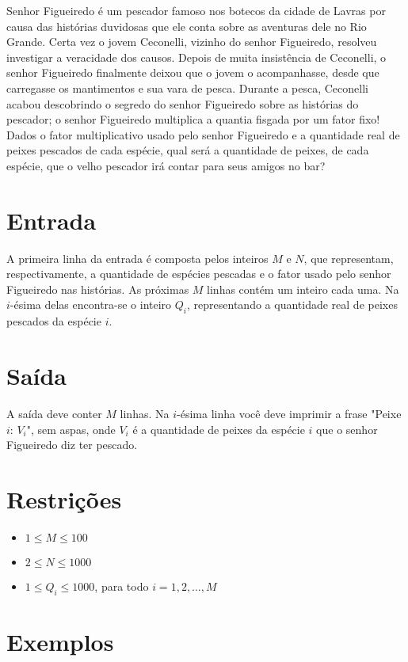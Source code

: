 Senhor Figueiredo é um pescador famoso nos botecos da cidade de Lavras por causa das histórias duvidosas que ele conta sobre as aventuras dele no Rio Grande.
Certa vez o jovem Ceconelli, vizinho do senhor Figueiredo, resolveu investigar a veracidade dos causos.
Depois de muita insistência de Ceconelli, o senhor Figueiredo finalmente deixou que o jovem o acompanhasse, desde que carregasse os mantimentos e sua vara de pesca.
Durante a pesca, Ceconelli acabou descobrindo o segredo do senhor Figueiredo sobre as histórias do pescador; o senhor Figueiredo multiplica a quantia fisgada por um fator fixo!
Dados o fator multiplicativo usado pelo senhor Figueiredo e a quantidade real de peixes pescados de cada espécie, qual será a quantidade de peixes, de cada espécie, que o velho pescador irá contar para seus amigos no bar?

\section*{Entrada}

A primeira linha da entrada é composta pelos inteiros $M$ e $N$, que representam, respectivamente, a quantidade de espécies pescadas e o fator usado pelo senhor Figueiredo nas histórias.
As próximas $M$ linhas contém um inteiro cada uma.
Na $i$-ésima delas encontra-se o inteiro $Q_i$, representando a quantidade real de peixes pescados da espécie $i$.

\section*{Saída}

A saída deve conter $M$ linhas.
Na $i$-ésima linha você deve imprimir a frase "Peixe $i$: $V_i$", sem aspas, onde $V_i$ é a quantidade de peixes da espécie $i$ que o senhor Figueiredo diz ter pescado.

\section*{Restrições}

\begin{itemize}
\item $1 \leq M \leq 100$
\item $2 \leq N \leq 1000$
\item $1 \leq Q_i \leq 1000$, para todo $i = 1, 2, \ldots, M$
\end{itemize}


\section*{Exemplos}

\exemplo
